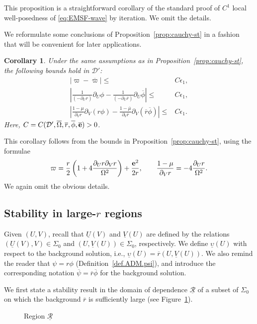 \documentclass[10pt, reqno]{amsart}
\newtheorem{corollary}[theorem]{Corollary}
\theoremstyle{definition}
\theoremstyle{remark}
\theoremstyle{conjecture}
\numberwithin{equation}{section}
\newcommand{\abs}[1]{\vert#1\vert}
\newcommand{\rd}{\partial}
\newcommand{\0}{\emptyset}
\newcommand{\eps}{\epsilon}
\newcommand{\Sgm}{\Sigma}
\newcommand{\Omg}{\Omega}
\newcommand{\ups}{\upsilon}
\newcommand{\bfe}{{\bf e}}
\newcommand{\calD}{\mathcal D}
\newcommand{\calR}{\mathcal R}
\newcommand{\e}{\bfe}							%
\newcommand{\Omgbg}{\overline{\Omg}}				%
\newcommand{\phibg}{\overline{\phi}}				%
\newcommand{\psibg}{\overline{\psi}}				%
\newcommand{\rbg}{\overline{r}}					%
\newcommand{\varpibg}{\overline{\varpi}}				%
\newcommand{\mubg}{\overline{\mu}}				%
\newcommand{\ebg}{\overline{\e}}					%
\newcommand{\Abs}[1]{\left\vert #1 \right\vert}
\begin{document}
This proposition is a straightforward corollary of the standard proof of $C^{1}$ local well-posedness of \eqref{eq:EMSF-wave} by iteration. We omit the details.

We reformulate some conclusions of Proposition~\ref{prop:cauchy-st} in a fashion that will be convenient for later applications.
\begin{corollary} \label{cor:cauchy-st:psidf-phidf}
Under the same assumptions as in Proposition~\ref{prop:cauchy-st}, the following bounds hold in $\calD'$:
\begin{align*}
	\abs{\varpi - \varpibg} \leq & C \eps_{1}, \\
	\Abs{\frac{1}{(- \rd_{U} r)} \rd_{U} \phi - \frac{1}{(- \rd_{U} \rbg)} \rd_{U} \phibg} \leq & C \eps_{1}, \\
	\Abs{\frac{1-\mu}{\rd_{V} r} \rd_{V} (r \phi) - \frac{1-\mubg}{\rd_{V} \rbg} \rd_{V} (\rbg \phibg)} \leq & C \eps_{1}.
\end{align*}
Here, $C = C(\calD', \Omgbg, \rbg, \phibg, \ebg) > 0$.
\end{corollary}

This corollary follows from the bounds in Proposition~\ref{prop:cauchy-st}, using the formulae
\begin{align*}
	\varpi = \frac{r}{2} \left(1 +4 \frac{\rd_{U} r \rd_{V} r}{\Omg^{2}} \right) + \frac{\e^{2}}{2 r}, \qquad
	\frac{1-\mu}{\rd_{V} r} = - 4 \frac{\rd_{U} r}{\Omg^{2}}.
\end{align*}
We again omit the obvious details.

\subsection{Stability in large-$r$ regions} \label{subsec:extr-st}
Given $(U, V)$, recall that $\underline{U}(V)$ and $\underline{V}(U)$ are defined by the relations $(\underline{U}(V), V) \in \Sgm_{0}$ and $(U, \underline{V}(U)) \in \Sgm_{0}$, respectively. We define $\underline{\ups} (U)$ with respect to the background solution, i.e., $\underline{\ups} (U)= \rbg(U, \underline{V}(U))$. We also remind the reader that $\psi = r \phi$ (Definition~\ref{def.ADM.psi}), and introduce the corresponding notation $\psibg = \rbg \phibg$ for the background solution.

We first state a stability result in the domain of dependence $\underline{\calR}$ of a subset of $\Sgm_{0}$ on which the background $\rbg$ is sufficiently large (see Figure~\ref{fig:extr-st-cauchy}).

\begin{figure}[h]
\begin{center}
\def\svgwidth{250px}
 
\caption{Region $\underline{\calR}$} \label{fig:extr-st-cauchy}
\end{center}
\end{figure}
\end{document}
